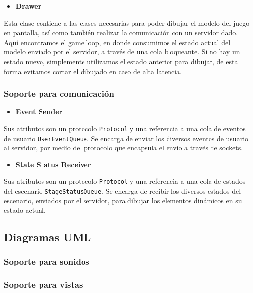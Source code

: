 \documentclass[a4paper]{article}
\begin{document}
\begin{itemize}
	\item \textbf{Drawer}
\end{itemize}

Esta clase contiene a las clases necesarias para poder dibujar el modelo del juego en pantalla, así como también realizar la comunicación con un servidor dado.
Aquí encontramos el game loop, en donde consumimos el estado actual del modelo enviado por el servidor, a través de una cola bloqueante. Si no hay un estado nuevo, simplemente utilizamos el estado anterior para dibujar, de esta forma evitamos cortar el dibujado en caso de alta latencia.

\subsubsection{Soporte para comunicación}

\begin{itemize}
	\item \textbf{Event Sender}
\end{itemize}

Sus atributos son un protocolo \texttt{Protocol} y una referencia a una cola de eventos de usuario \texttt{UserEventQueue}. Se encarga de enviar los diversos eventos de usuario al servidor, por medio del protocolo que encapsula el envío a través de sockets.

\begin{itemize}
	\item \textbf{State Status Receiver}
\end{itemize}

Sus atributos son un protocolo \texttt{Protocol} y una referencia a una cola de estados del escenario \texttt{StageStatusQueue}. Se encarga de recibir los diversos estados del escenario, enviados por el servidor, para dibujar los elementos dinámicos en su estado actual.

\subsection{Diagramas UML}

\subsubsection{Soporte para sonidos}

\subsubsection{Soporte para vistas}
\end{document}
